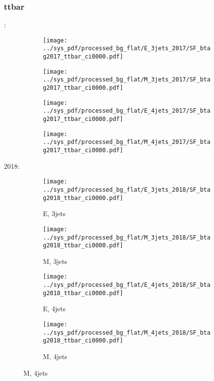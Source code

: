 \documentclass{beamer}
\begin{document}
\begin{frame}
\frametitle{ttbar}
\fontsize{5}{1}:
\begin{figure}
\centering
\begin{subfigure}[b]{0.24\textwidth}
\texttt{[image: ../sys\_pdf/processed\_bg\_flat/E\_3jets\_2017/SF\_btag2017\_ttbar\_ci0000.pdf]}
\end{subfigure}
\begin{subfigure}[b]{0.24\textwidth}
\texttt{[image: ../sys\_pdf/processed\_bg\_flat/M\_3jets\_2017/SF\_btag2017\_ttbar\_ci0000.pdf]}
\end{subfigure}
\begin{subfigure}[b]{0.24\textwidth}
\texttt{[image: ../sys\_pdf/processed\_bg\_flat/E\_4jets\_2017/SF\_btag2017\_ttbar\_ci0000.pdf]}
\end{subfigure}
\begin{subfigure}[b]{0.24\textwidth}
\texttt{[image: ../sys\_pdf/processed\_bg\_flat/M\_4jets\_2017/SF\_btag2017\_ttbar\_ci0000.pdf]}
\end{subfigure}
\end{figure}
2018:
\begin{figure}
\centering
\begin{subfigure}[b]{0.24\textwidth}
\texttt{[image: ../sys\_pdf/processed\_bg\_flat/E\_3jets\_2018/SF\_btag2018\_ttbar\_ci0000.pdf]}
\captionsetup{font=tiny}
\caption{E, 3jets}
\end{subfigure}
\begin{subfigure}[b]{0.24\textwidth}
\texttt{[image: ../sys\_pdf/processed\_bg\_flat/M\_3jets\_2018/SF\_btag2018\_ttbar\_ci0000.pdf]}
\captionsetup{font=tiny}
\caption{M, 3jets}
\end{subfigure}
\begin{subfigure}[b]{0.24\textwidth}
\texttt{[image: ../sys\_pdf/processed\_bg\_flat/E\_4jets\_2018/SF\_btag2018\_ttbar\_ci0000.pdf]}
\captionsetup{font=tiny}
\caption{E, 4jets}
\end{subfigure}
\begin{subfigure}[b]{0.24\textwidth}
\texttt{[image: ../sys\_pdf/processed\_bg\_flat/M\_4jets\_2018/SF\_btag2018\_ttbar\_ci0000.pdf]}
\captionsetup{font=tiny}
\caption{M, 4jets}
\end{subfigure}
\end{figure}
\end{frame}
\end{document}
